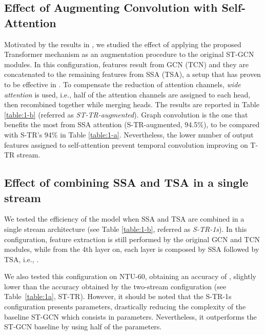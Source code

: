 \documentclass[review]{cvpr}
\begin{document}
\subsection{Effect of Augmenting Convolution with Self-Attention} 
Motivated by the results in \cite{DBLP:journals/corr/abs-1904-09925}, we studied the effect of applying the proposed Transformer mechanism as an augmentation procedure to the original ST-GCN modules. In this configuration,  features result from GCN (TCN) and they are concatenated to the remaining  features from SSA (TSA), a setup that
has proven to be effective in \cite{DBLP:journals/corr/abs-1904-09925}. To compensate the reduction of attention channels, \textit{wide attention} is used, i.e., half of the attention channels are assigned to each head, then recombined together while merging heads. The results are reported in Table \ref{table:1-b} (referred as \textit{ST-TR-augmented}). Graph convolution is the one that benefits the most from SSA attention (S-TR-augmented, 94.5\%), to be compared with S-TR's 94\% in Table \ref{table:1-a}. Nevertheless, the lower number of output features assigned to self-attention prevent temporal convolution improving on T-TR stream. 


\subsection{Effect of combining SSA and TSA in a single stream}
We tested the efficiency of the model when SSA and TSA are combined in a single stream architecture (see Table \ref{table:1-b}, referred as \textit{S-TR-1s}). In this configuration, feature extraction is still performed by the original GCN and TCN modules, while from the 4th layer on, each layer is composed by SSA followed by TSA, i.e., .

We also  tested this configuration on NTU-60, obtaining an accuracy of , slightly lower than the  accuracy obtained by the two-stream configuration (see Table~\ref{table:1a}, ST-TR). However, it should be noted that the S-TR-1s configuration presents  parameters, drastically reducing the complexity of the baseline ST-GCN which consists in  parameters. Nevertheless, it outperforms the ST-GCN baseline by  using half of the parameters.
\end{document}
